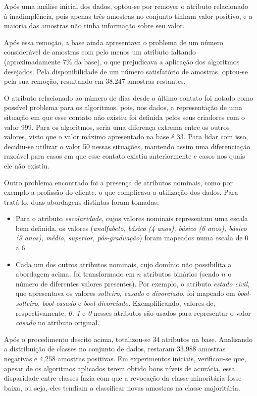 Após uma análise inicial dos dados, optou-se por remover o atributo relacionado à inadimplência, pois apenas três amostras no conjunto tinham valor positivo, e a maioria das amostras não tinha informação sobre seu valor.

Após essa remoção, a base ainda apresentava o problema de um número considerável de amostras com pelo menos um atributo faltando (aproximadamente 7\% da base), o que prejudicava a aplicação dos algoritmos desejados. Pela disponibilidade de um número satisfatório de amostras, optou-se pela sua remoção, resultando em 38.247 amostras restantes.

O atributo relacionado ao número de dias desde o último contato foi notado como possível problema para os algoritmos, pois, nos dados, a representação de uma situação em que esse contato não existiu foi definida pelos seus criadores com o valor 999. Para os algoritmos, seria uma diferença extrema entre os outros valores, visto que o valor máximo apresentado na base é 33. Para lidar com isso, decidiu-se utilizar o valor 50 nessas situações, mantendo assim uma diferenciação razoável para casos em que esse contato existiu anteriormente e casos nos quais ele não existiu.

Outro problema encontrado foi a presença de atributos nominais, como por exemplo a profissão do cliente, o que complicava a utilização dos dados. Para tratá-lo, duas abordagens distintas foram tomadas:

\begin{itemize}
\item Para o atributo \emph{escolaridade}, cujos valores nominais representam uma escala bem definida, os valores (\emph{analfabeto, básico (4 anos), básico (6 anos), básico (9 anos), médio, superior, pós-graduação}) foram mapeados numa escala de 0 a 6.
\item Cada um dos outros atributos nominais, cujo domínio não possibilita a abordagem acima, foi transformado em $n$ atributos binários (sendo $n$ o número de diferentes valores presentes). Por exemplo, o atributo \emph{estado civil}, que apresentava os valores \emph{solteiro, casado} e \emph{divorciado}, foi mapeado em \emph{bool-solteiro, bool-casado} e \emph{bool-divorciado}. Exemplificando, valores de, respectivamente, \emph{0, 1} e \emph{0} nesses atributos são usados para representar o valor \emph{casado} no atributo original. 
\end{itemize}

Após o procedimento descito acima, totalizou-se 34 atributos na base. Analisando a distribuição de classes no conjunto de dados, restaram 33.988 amostras negativas e 4,258 amostras positivas. Em experimentos iniciais, verificou-se que, apesar de os algoritmos aplicados terem obtido bons níveis de acurácia, essa disparidade entre classes fazia com que a revocação da classe minoritária fosse baixa, ou seja, eles tendiam a classificar novas amostras na classe majoritária. 

